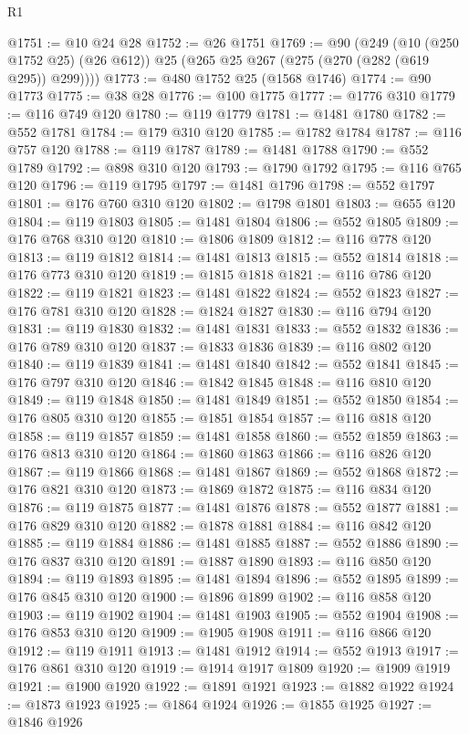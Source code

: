 \begin{lexlean}{R1}
\begin{coremodule}
@1751 := @10 @24 @28
@1752 := @26 @1751
@1769 := @90
    (@249
      (@10 (@250 @1752 @25) (@26 @612))
      @25
      (@265 @25 @267 (@275 (@270 (@282 (@619 @295)) @299))))
@1773 := @480 @1752 @25 (@1568 @1746)
@1774 := @90 @1773
@1775 := @38 @28
@1776 := @100 @1775
@1777 := @1776 @310
@1779 := @116 @749 @120
@1780 := @119 @1779
@1781 := @1481 @1780
@1782 := @552 @1781
@1784 := @179 @310 @120
@1785 := @1782 @1784
@1787 := @116 @757 @120
@1788 := @119 @1787
@1789 := @1481 @1788
@1790 := @552 @1789
@1792 := @898 @310 @120
@1793 := @1790 @1792
@1795 := @116 @765 @120
@1796 := @119 @1795
@1797 := @1481 @1796
@1798 := @552 @1797
@1801 := @176 @760 @310 @120
@1802 := @1798 @1801
@1803 := @655 @120
@1804 := @119 @1803
@1805 := @1481 @1804
@1806 := @552 @1805
@1809 := @176 @768 @310 @120
@1810 := @1806 @1809
@1812 := @116 @778 @120
@1813 := @119 @1812
@1814 := @1481 @1813
@1815 := @552 @1814
@1818 := @176 @773 @310 @120
@1819 := @1815 @1818
@1821 := @116 @786 @120
@1822 := @119 @1821
@1823 := @1481 @1822
@1824 := @552 @1823
@1827 := @176 @781 @310 @120
@1828 := @1824 @1827
@1830 := @116 @794 @120
@1831 := @119 @1830
@1832 := @1481 @1831
@1833 := @552 @1832
@1836 := @176 @789 @310 @120
@1837 := @1833 @1836
@1839 := @116 @802 @120
@1840 := @119 @1839
@1841 := @1481 @1840
@1842 := @552 @1841
@1845 := @176 @797 @310 @120
@1846 := @1842 @1845
@1848 := @116 @810 @120
@1849 := @119 @1848
@1850 := @1481 @1849
@1851 := @552 @1850
@1854 := @176 @805 @310 @120
@1855 := @1851 @1854
@1857 := @116 @818 @120
@1858 := @119 @1857
@1859 := @1481 @1858
@1860 := @552 @1859
@1863 := @176 @813 @310 @120
@1864 := @1860 @1863
@1866 := @116 @826 @120
@1867 := @119 @1866
@1868 := @1481 @1867
@1869 := @552 @1868
@1872 := @176 @821 @310 @120
@1873 := @1869 @1872
@1875 := @116 @834 @120
@1876 := @119 @1875
@1877 := @1481 @1876
@1878 := @552 @1877
@1881 := @176 @829 @310 @120
@1882 := @1878 @1881
@1884 := @116 @842 @120
@1885 := @119 @1884
@1886 := @1481 @1885
@1887 := @552 @1886
@1890 := @176 @837 @310 @120
@1891 := @1887 @1890
@1893 := @116 @850 @120
@1894 := @119 @1893
@1895 := @1481 @1894
@1896 := @552 @1895
@1899 := @176 @845 @310 @120
@1900 := @1896 @1899
@1902 := @116 @858 @120
@1903 := @119 @1902
@1904 := @1481 @1903
@1905 := @552 @1904
@1908 := @176 @853 @310 @120
@1909 := @1905 @1908
@1911 := @116 @866 @120
@1912 := @119 @1911
@1913 := @1481 @1912
@1914 := @552 @1913
@1917 := @176 @861 @310 @120
@1919 := @1914 @1917 @1809
@1920 := @1909 @1919
@1921 := @1900 @1920
@1922 := @1891 @1921
@1923 := @1882 @1922
@1924 := @1873 @1923
@1925 := @1864 @1924
@1926 := @1855 @1925
@1927 := @1846 @1926

\end{coremodule}
\end{lexlean}

